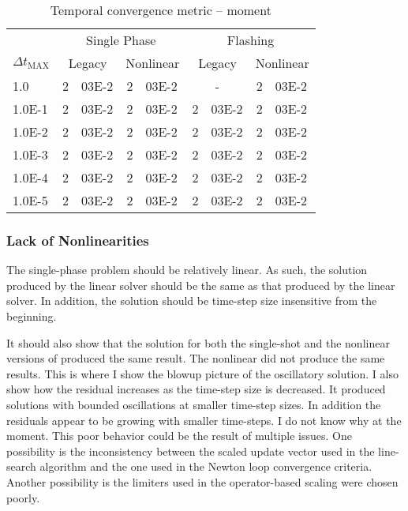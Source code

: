 \begin{table}[h!t]
\centering
\begin{tabular}{@{}l r@{.}l r@{.}l r@{.}l r@{.}l @{}}
\toprule
& \multicolumn{4}{c}{Single Phase} & \multicolumn{4}{c}{Flashing}  \\
$\Delta t_{\text{MAX}}$ & \multicolumn{2}{c}{Legacy} & \multicolumn{2}{c}{Nonlinear} & \multicolumn{2}{c}{Legacy}& \multicolumn{2}{c}{Nonlinear}  \\
\midrule
1.0    & 2&03E-2 & 2&03E-2 & \multicolumn{2}{c}{-} & 2&03E-2 \\
1.0E-1 & 2&03E-2 & 2&03E-2 & 2&03E-2 & 2&03E-2 \\
1.0E-2 & 2&03E-2 & 2&03E-2 & 2&03E-2 & 2&03E-2 \\
1.0E-3 & 2&03E-2 & 2&03E-2 & 2&03E-2 & 2&03E-2 \\
1.0E-4 & 2&03E-2 & 2&03E-2 & 2&03E-2 & 2&03E-2 \\
1.0E-5 & 2&03E-2 & 2&03E-2 & 2&03E-2 & 2&03E-2 \\
\bottomrule  
\end{tabular}
\caption{Temporal convergence metric -- moment}
\label{tab:criteria_moment}
\end{table}

\subsubsection{Lack of Nonlinearities}
\label{sect:result_linear_problem}


The single-phase problem should be relatively linear.
As such, the solution produced by the linear solver should be the same as that produced by the linear solver.
In addition, the solution should be time-step size insensitive from the beginning.


It should also show that the solution for both the single-shot and the nonlinear versions of \cobra{} produced the same result.
The nonlinear \cobra{} did not produce the same results.
This is where I show the blowup picture of the oscillatory solution.
I also show how the residual increases as the time-step size is decreased.
It produced solutions with bounded oscillations at smaller time-step sizes.
In addition the residuals appear to be growing with smaller time-steps.
I do not know why at the moment.
This poor behavior could be the result of multiple issues.
One possibility is the inconsistency between the scaled update vector used in the line-search algorithm and  the one used in the Newton loop convergence criteria.
Another possibility is the limiters used in the operator-based scaling were chosen poorly.

